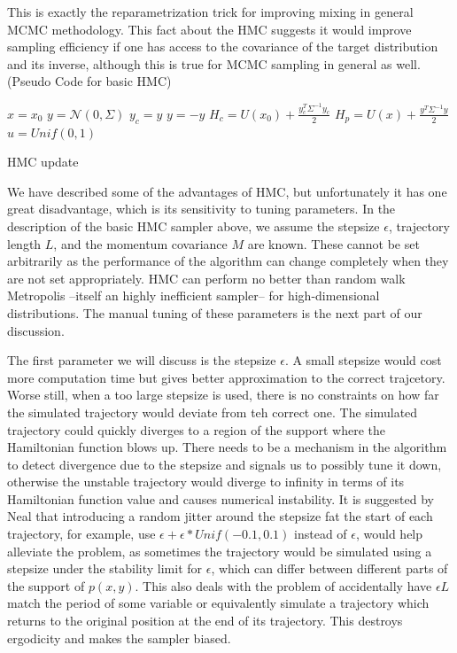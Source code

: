 \documentclass[]{report}
\begin{document}
This is exactly the
reparametrization trick for improving mixing in general MCMC methodology. This
fact about the HMC suggests it would improve sampling efficiency if one has
access to the covariance of the target distribution and its inverse, although this is true for
MCMC sampling in general as well. 
(Pseudo Code for basic HMC)
\begin{algorithm}
    $x = x_0$ \;
    $y = \mathcal{N}(0,\Sigma)$ \;
    $y_{c} = y$ \;
    $y = -y $ \;
    $H_{c} = U(x_0) + \frac{y_c^T\Sigma^{-1}y_c}{2}$ \;
    $H_{p} = U(x) + \frac{y^T\Sigma^{-1}y}{2}$ \;
    $u  = Unif(0,1)$ \;
\caption{HMC update}
\end{algorithm}

We have described some of the advantages of HMC, but unfortunately it has one great disadvantage, which is its sensitivity to tuning parameters. 
In the description of the basic HMC sampler above, we assume the stepsize $\epsilon$, trajectory length $L$, and the momentum covariance $M$ are known. These cannot be set arbitrarily as the performance of the algorithm can change completely when they are not set appropriately. HMC can perform no better than random walk Metropolis --itself an highly inefficient sampler-- for high-dimensional distributions. The manual tuning of these parameters is the next part of our discussion. 

The first parameter we will discuss is the stepsize $\epsilon$. A small stepsize would cost more computation time but gives better approximation to the correct trajcetory. Worse still, when a too large stepsize is used, there is no constraints on how far the simulated trajectory would deviate from teh correct one. The simulated trajectory could quickly diverges to a region of the support where the Hamiltonian function blows up. There needs to be a mechanism in the algorithm to detect divergence due to the stepsize and signals us to possibly tune it down, otherwise the unstable trajectory would diverge to infinity in terms of its Hamiltonian function value and causes numerical instability. It is suggested by Neal that introducing a random jitter around the stepsize fat the start of each trajectory, for example, use $\epsilon + \epsilon*Unif(-0.1,0.1)$ instead of $\epsilon$,  would help alleviate the problem, as sometimes the trajectory would be simulated using a stepsize under the stability limit for $\epsilon$, which can differ between different parts of the support of $p(x,y)$. This also deals with the problem of accidentally have $\epsilon L$ match the period of some variable or equivalently simulate a trajectory which returns to the original position at the end of its trajectory. This destroys ergodicity and makes the sampler biased.
\end{document}
